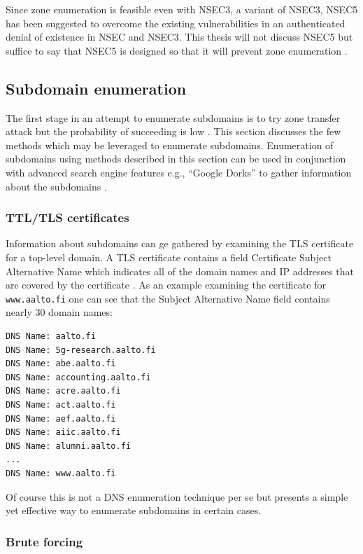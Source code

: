 Since zone enumeration is feasible even with NSEC3, a variant of NSEC3, NSEC5 \cite{NSEC5} has been suggested to overcome the existing vulnerabilities in an authenticated denial of existence in NSEC and NSEC3. This thesis will not discuss NSEC5 but suffice to say that NSEC5 is designed so that it will prevent zone enumeration \cite{NSEC5_provably}. 



\subsection{Subdomain enumeration}

The first stage in an attempt to enumerate subdomains is to try zone transfer attack but the probability of succeeding is low \cite{NSEC3_hash_breaking}. This section discusses the few methods which may be leveraged to enumerate subdomains. Enumeration of subdomains using methods described in this section can be used in conjunction with advanced search engine features e.g., “Google Dorks” to gather information about the subdomains \cite{hacking_exposed}.


\subsubsection{TTL/TLS certificates}

Information about subdomains can ge gathered by examining the TLS certificate for a top-level domain. A TLS certificate contains a field Certificate Subject Alternative Name which indicates all of the domain names and IP addresses that are covered by the certificate \citep{hacking_exposed}. As an example examining the certificate for \texttt{www.aalto.fi} one can see that the Subject Alternative Name field contains nearly 30 domain names:

\begin{verbatim}
DNS Name: aalto.fi
DNS Name: 5g-research.aalto.fi
DNS Name: abe.aalto.fi
DNS Name: accounting.aalto.fi
DNS Name: acre.aalto.fi
DNS Name: act.aalto.fi
DNS Name: aef.aalto.fi
DNS Name: aiic.aalto.fi
DNS Name: alumni.aalto.fi
...
DNS Name: www.aalto.fi
\end{verbatim}

Of course this is not a DNS enumeration technique per se but presents a simple yet effective way to enumerate subdomains in certain cases.

\subsubsection{Brute forcing}

